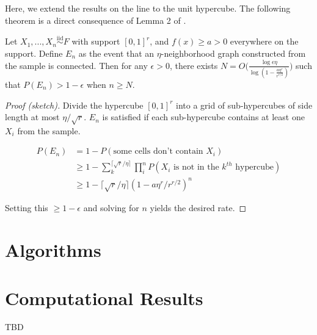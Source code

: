 \documentclass[
  11pt,
]{article}
\begin{document}
Here, we extend the results on the line to the unit hypercube. The
following theorem is a direct consequence of Lemma 2 of
\citet{trosset2020rehabilitating}.

\begin{theorem}
\label{thm:multidim}
Let $X_1, ..., X_n \stackrel{\mathrm{iid}}{\sim}F$ with support $[0, 1]^r$, and $f(x) \geq a > 0$ everywhere on the support. 
Define $E_n$ as the event that an $\eta$-neighborhood graph constructed from the sample is connected. 
Then for any $\epsilon > 0$, there exists $N = O \bigg( \frac{\log \epsilon \eta}{\log (1 - \frac{a \eta^r}{r^{r / 2}})} \bigg)$ such that $P(E_n) > 1 - \epsilon$ when $n \geq N$.
\end{theorem}

\begin{proof}[Proof (sketch)]
Divide the hypercube $[0, 1]^r$ into a grid of sub-hypercubes of side length at most $\eta / \sqrt{r}$. 
$E_n$ is satisfied if each sub-hypercube contains at least one $X_i$ from the sample. 

$$
\begin{aligned}
P(E_n) & = 1 - P(\text{some cells don't contain } X_i) \\
& \geq 1 - \sum_k^{\lceil \sqrt{r} / \eta \rceil} \prod_i^n P(X_i \text{ is not in the } k^{th} \text{ hypercube}) \\
& \geq 1 - \lceil \sqrt{r} / \eta \rceil (1 - a \eta^r / r^{r/2})^n
\end{aligned}
$$

Setting this $\geq 1 - \epsilon$ and solving for $n$ yields the desired rate. 
\end{proof}

\hypertarget{algorithms}{%
\section{Algorithms}\label{algorithms}}

\hypertarget{computational-results}{%
\section{Computational Results}\label{computational-results}}

TBD

\renewcommand\refname{References}
  
\end{document}
